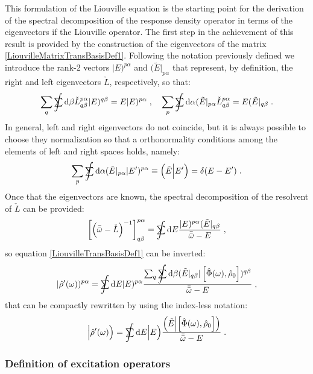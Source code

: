 \documentclass[a4paper]{article}
\newcommand{\dd}{{\rm d}}
\newcommand{\bbomega}{{\bar{\bar\omega}}}
\newcommand{\sint}{\mathrlap{\displaystyle\int}
\mathrlap{\textstyle\sum}
\phantom{\mathrlap{\displaystyle
\int}\textstyle\sum}}
\newcommand{\be}{\begin{equation}}
\newcommand{\ee}{\end{equation}}
\newcommand{\lb}{\label}
\newcommand{\op}[1]{\hat {#1}}
\newcommand{\commutator}[2]{\left[ {#1} , {#2} \right]}
\newcommand{\optr}[1]{\check #1}
\newcommand{\sket}[2]{| #2)^{#1}}
\newcommand{\sbra}[2]{( #2|_{#1}}
\newcommand{\dket}[1]{\Bigl| #1 \Bigr)}
\newcommand{\dbraket}[2]{\Bigl(#1 \Bigl| #2 \Bigr)}
\newcommand{\dmnot}{\op{\rho}_0}
\newcommand{\dm}{\op{\rho}}
\begin{document}
This formulation of the Liouville equation is the starting point for the derivation of the spectral decomposition of the response density operator
in terms of the eigenvectors if the Liouville operator. 
The first step in the achievement of this result is provided by the construction of the eigenvectors of the matrix \eqref{LiouvilleMatrixTransBasisDef1}.
Following the notation previously defined we introduce the rank-2 vectors $\sket{p\alpha}{E}$ and $\sbra{p\alpha}{\tilde E}$ that represent, by definition,
the right and left eigenvectors $\optr{L}$, respectively, so that:
\be\lb{LiouvMatrixEigenvectorDef1}
\sum_q \sint \dd \beta \optr{L}^{p \alpha}_{q\beta} \sket{q \beta}{E} = E \sket{p\alpha}{E} \;, \quad
\sum_p \sint \dd \alpha \sbra{p\alpha}{\tilde E} \optr{L}^{p \alpha}_{q\beta} = E \sbra{q\beta}{\tilde E}\;.
\ee
In general, left and right eigenvectors do not coincide, but it is always possible to choose they normalization so that a orthonormality conditions among the
elements of left and right spaces holds, namely:
\be\lb{ExcitationOrthonormalityDef1}
\sum_p \sint \dd \alpha \sbra{p\alpha}{\tilde E}\sket{p\alpha}{E'} \equiv \dbraket{\tilde E}{E'} = \delta(E-E') \;.
\ee
Once that the eigenvectors are known, the spectral decomposition of the resolvent of $\optr{L}$ can be provided:  
\be
\left[\left(\bbomega-\optr{L}\right)^{-1}\right]^{p\alpha}_{q\beta} =\sint\dd E
\frac{\sket{p\alpha}{E}\sbra{q\beta}{\tilde E}}{\bbomega-E} \;,
\ee
so equation \eqref{LiouvilleTransBasisDef1} can be inverted:
\be\lb{RhopExcitationTransBasisDef1}
\sket{p\alpha}{\dm'(\omega)} = \sint\dd E \sket{p\alpha}{E}
\frac{\sum_q \sint \dd \beta\sbra{q\beta}{\tilde E}
\sket{q\beta}{\commutator{\op\Phi(\omega)}{\dmnot}}}{\bbomega-E} \;,
\ee
that can be compactly rewritten by using the index-less notation:
\be\lb{RhopExcitationTransBasisDef2}
\dket{\dm'(\omega)} = 
\sint\dd E \dket{E}
\frac{\dbraket{\tilde E}{\commutator{\op\Phi(\omega)}{\dmnot}}}{\bbomega-E} \;.
\ee

\subsubsection{Definition of excitation operators}
\end{document}
